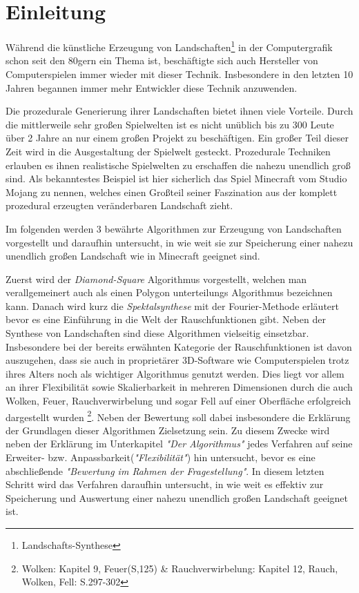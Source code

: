 \chapter{Einleitung}

Während die künstliche Erzeugung von Landschaften\footnote{Landschafts-Synthese} in der Computergrafik schon seit den 80gern ein Thema ist, beschäftigte sich auch Hersteller von Computerspielen immer wieder mit dieser Technik. Insbesondere in den letzten 10 Jahren begannen immer mehr Entwickler diese Technik anzuwenden.

Die prozedurale Generierung ihrer Landschaften bietet ihnen viele Vorteile. 
Durch die mittlerweile sehr großen Spielwelten ist es nicht unüblich bis zu 300 Leute über 2 Jahre an nur einem großen Projekt zu beschäftigen. Ein großer Teil dieser Zeit wird in die Ausgestaltung der Spielwelt gesteckt. Prozedurale Techniken erlauben es ihnen realistische Spielwelten zu erschaffen die nahezu unendlich groß sind.
Als bekanntestes Beispiel ist hier sicherlich das Spiel Minecraft vom Studio Mojang zu nennen, welches einen Großteil seiner Faszination aus der komplett prozedural erzeugten veränderbaren Landschaft zieht.

Im folgenden werden 3 bewährte Algorithmen zur Erzeugung von Landschaften vorgestellt und daraufhin untersucht, in wie weit sie zur Speicherung einer nahezu unendlich großen Landschaft wie in Minecraft geeignet sind.

Zuerst wird der \emph{Diamond-Square} Algorithmus\cite{DiamondSquare} vorgestellt, welchen man verallgemeinert auch als einen Polygon unterteilungs Algorithmus bezeichnen kann. Danach wird kurz die \emph{Spektalsynthese} mit der Fourier-Methode erläutert bevor es eine Einführung in die Welt der Rauschfunktionen gibt. 
Neben der Synthese von Landschaften sind diese Algorithmen vielseitig einsetzbar. Insbesondere bei der bereits erwähnten Kategorie der Rauschfunktionen ist davon auszugehen, dass sie auch in proprietärer 3D-Software wie Computerspielen trotz ihres Alters noch als wichtiger Algorithmus genutzt werden. Dies liegt vor allem an ihrer Flexibilität sowie Skalierbarkeit in mehreren Dimensionen durch die auch Wolken, Feuer, Rauchverwirbelung und sogar Fell auf einer Oberfläche erfolgreich dargestellt wurden \cite{texturingAndModeling}\footnote{Wolken: Kapitel 9, Feuer(S,125) \& Rauchverwirbelung: Kapitel 12, Rauch, Wolken, Fell: S.297-302}.
Neben der Bewertung soll dabei insbesondere die Erklärung der Grundlagen dieser Algorithmen Zielsetzung sein. Zu diesem Zwecke wird neben der Erklärung im Unterkapitel \emph{"Der Algorithmus"} jedes Verfahren auf seine Erweiter- bzw. Anpassbarkeit(\emph{"Flexibilität"}) hin untersucht, bevor es eine abschließende \emph{"Bewertung im Rahmen der Fragestellung"}. In diesem letzten Schritt wird das Verfahren daraufhin untersucht, in wie weit es effektiv zur Speicherung und Auswertung einer nahezu unendlich großen Landschaft geeignet ist.

